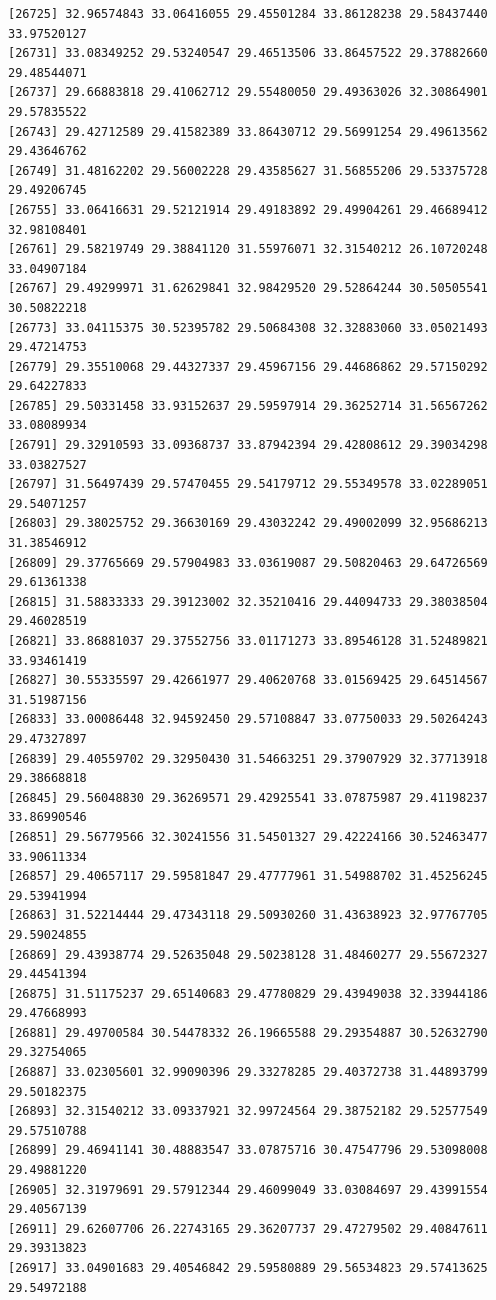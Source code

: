 \documentclass[
  letterpaper,
  DIV=11,
  numbers=noendperiod]{scrartcl}
\begin{document}
\begin{verbatim}
[26725] 32.96574843 33.06416055 29.45501284 33.86128238 29.58437440 33.97520127
[26731] 33.08349252 29.53240547 29.46513506 33.86457522 29.37882660 29.48544071
[26737] 29.66883818 29.41062712 29.55480050 29.49363026 32.30864901 29.57835522
[26743] 29.42712589 29.41582389 33.86430712 29.56991254 29.49613562 29.43646762
[26749] 31.48162202 29.56002228 29.43585627 31.56855206 29.53375728 29.49206745
[26755] 33.06416631 29.52121914 29.49183892 29.49904261 29.46689412 32.98108401
[26761] 29.58219749 29.38841120 31.55976071 32.31540212 26.10720248 33.04907184
[26767] 29.49299971 31.62629841 32.98429520 29.52864244 30.50505541 30.50822218
[26773] 33.04115375 30.52395782 29.50684308 32.32883060 33.05021493 29.47214753
[26779] 29.35510068 29.44327337 29.45967156 29.44686862 29.57150292 29.64227833
[26785] 29.50331458 33.93152637 29.59597914 29.36252714 31.56567262 33.08089934
[26791] 29.32910593 33.09368737 33.87942394 29.42808612 29.39034298 33.03827527
[26797] 31.56497439 29.57470455 29.54179712 29.55349578 33.02289051 29.54071257
[26803] 29.38025752 29.36630169 29.43032242 29.49002099 32.95686213 31.38546912
[26809] 29.37765669 29.57904983 33.03619087 29.50820463 29.64726569 29.61361338
[26815] 31.58833333 29.39123002 32.35210416 29.44094733 29.38038504 29.46028519
[26821] 33.86881037 29.37552756 33.01171273 33.89546128 31.52489821 33.93461419
[26827] 30.55335597 29.42661977 29.40620768 33.01569425 29.64514567 31.51987156
[26833] 33.00086448 32.94592450 29.57108847 33.07750033 29.50264243 29.47327897
[26839] 29.40559702 29.32950430 31.54663251 29.37907929 32.37713918 29.38668818
[26845] 29.56048830 29.36269571 29.42925541 33.07875987 29.41198237 33.86990546
[26851] 29.56779566 32.30241556 31.54501327 29.42224166 30.52463477 33.90611334
[26857] 29.40657117 29.59581847 29.47777961 31.54988702 31.45256245 29.53941994
[26863] 31.52214444 29.47343118 29.50930260 31.43638923 32.97767705 29.59024855
[26869] 29.43938774 29.52635048 29.50238128 31.48460277 29.55672327 29.44541394
[26875] 31.51175237 29.65140683 29.47780829 29.43949038 32.33944186 29.47668993
[26881] 29.49700584 30.54478332 26.19665588 29.29354887 30.52632790 29.32754065
[26887] 33.02305601 32.99090396 29.33278285 29.40372738 31.44893799 29.50182375
[26893] 32.31540212 33.09337921 32.99724564 29.38752182 29.52577549 29.57510788
[26899] 29.46941141 30.48883547 33.07875716 30.47547796 29.53098008 29.49881220
[26905] 32.31979691 29.57912344 29.46099049 33.03084697 29.43991554 29.40567139
[26911] 29.62607706 26.22743165 29.36207737 29.47279502 29.40847611 29.39313823
[26917] 33.04901683 29.40546842 29.59580889 29.56534823 29.57413625 29.54972188

\end{verbatim}
\end{document}
